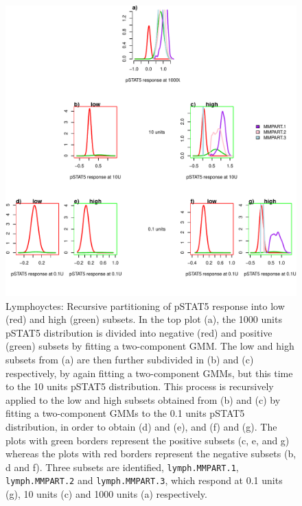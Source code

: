 %
\begin{figure}[!h]
\centering
\includegraphics[scale=.7]{figures/mmpart-lymphocytes-tree}
{ Lymphoyctes: Recursive partitioning of pSTAT5 response into low (red) and high (green) subsets. }
{
    In the top plot (a), the 1000 units pSTAT5 distribution is divided into negative (red) and positive (green) subsets by fitting a two-component \gls{GMM}.
    The low and high subsets from (a) are then further subdivided in (b) and (c) respectively, by again fitting a two-component \glspl{GMM},
    but this time to the 10 units pSTAT5 distribution.
    This process is recursively applied to the low and high subsets obtained from (b) and (c) by fitting a two-component \glspl{GMM} to the 0.1 units pSTAT5 distribution, in order
    to obtain (d) and (e), and (f) and (g).
    The plots with green borders represent the positive subsets (c, e, and g) whereas the plots with red borders represent the negative subsets (b, d and f).
    Three subsets are identified, \texttt{lymph.MMPART.1}, \texttt{lymph.MMPART.2} and \texttt{lymph.MMPART.3}, which respond at 0.1 units (g), 10 units (c) and 1000 units (a) respectively.
}
\end{figure}

